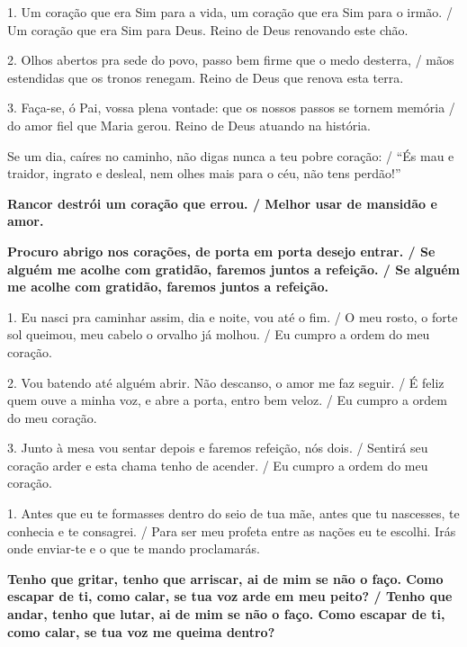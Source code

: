 \documentclass[a5paper,9pt]{extarticle}
\begin{document}
\begin{cantos}
\begin{canto}
1. Um coração que era Sim para a vida, um coração que era Sim para o irmão. / Um coração que era Sim para Deus. Reino de Deus renovando este chão.

2. Olhos abertos pra sede do povo, passo bem firme que o medo desterra, / mãos estendidas que os tronos renegam. Reino de Deus que renova esta terra.

3. Faça-se, ó Pai, vossa plena vontade: que os nossos passos se tornem memória / do amor fiel que Maria gerou. Reino de Deus atuando na história.
\end{canto}

\begin{canto}
Se um dia, caíres no caminho, não digas nunca a teu pobre coração: / ``És mau e traidor, ingrato e desleal, nem olhes mais para o céu, não tens perdão!''

\textbf{Rancor destrói um coração que errou. / Melhor usar de mansidão e amor.}
\end{canto}

\begin{canto}
\textbf{Procuro abrigo nos corações, de porta em porta desejo entrar. / Se alguém me acolhe com gratidão, faremos juntos a refeição. / Se alguém me acolhe com gratidão, faremos juntos a refeição.}

1. Eu nasci pra caminhar assim, dia e noite, vou até o fim. / O meu rosto, o forte sol queimou, meu cabelo o orvalho já molhou. / Eu cumpro a ordem do meu coração.

2. Vou batendo até alguém abrir. Não descanso, o amor me faz seguir. / É feliz quem ouve a minha voz, e abre a porta, entro bem veloz. / Eu cumpro a ordem do meu coração.

3. Junto à mesa vou sentar depois e faremos refeição, nós dois. / Sentirá seu coração arder e esta chama tenho de acender. / Eu cumpro a ordem do meu coração.
\end{canto}

\begin{canto}
1. Antes que eu te formasses dentro do seio de tua mãe, antes que tu nascesses, te conhecia e te consagrei. / Para ser meu profeta entre as nações eu te escolhi. Irás onde enviar-te e o que te mando proclamarás.

\textbf{Tenho que gritar, tenho que arriscar, ai de mim se não o faço. Como escapar de ti, como calar, se tua voz arde em meu peito? / Tenho que andar, tenho que lutar, ai de mim se não o faço. Como escapar de ti, como calar, se tua voz me queima dentro?}


\end{canto}
\end{cantos}
\end{document}
